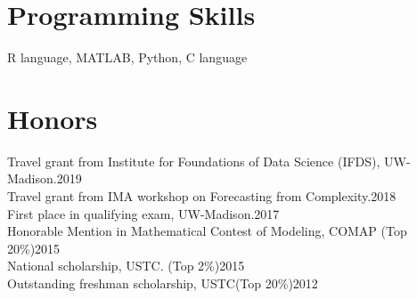 \documentclass[letterpaper,11pt]{article}
\begin{document}
	\section{Programming Skills}
	 R language,  MATLAB, Python, C language
	\section{Honors}
	{Travel grant from Institute for Foundations of Data Science (IFDS), UW-Madison.\hfill                       2019\\
		Travel grant from IMA workshop on Forecasting from Complexity.\hfill                              2018\\
		First place in qualifying exam, UW-Madison.\hfill                                                2017\\
		Honorable Mention in Mathematical Contest of Modeling, COMAP (Top 20\%)\hfill        2015\\
		National scholarship, USTC. (Top 2\%)\hfill                                       2015\\
		Outstanding freshman scholarship, USTC(Top 20\%)\hfill                                   2012\\}
	
\end{document}
